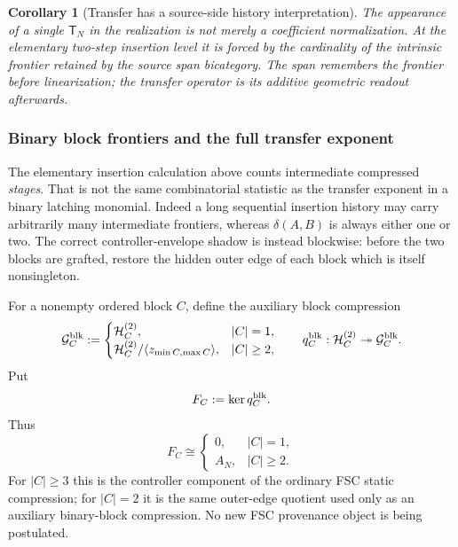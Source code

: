 \documentclass[11pt]{article}
\newtheorem{corollary}[theorem]{Corollary}
\theoremstyle{remark}
\begin{document}
\begin{corollary}[Transfer has a source-side history interpretation]
\label{P2M-cor:v15-transfer-source-history}
The appearance of a single $\mathsf T_N$ in the realization is not merely a
coefficient normalization.  At the elementary two-step insertion level it is
forced by the cardinality of the intrinsic frontier retained by the source
span bicategory.  The span remembers the frontier before linearization; the
transfer operator is its additive geometric readout afterwards.
\end{corollary}


\subsubsection{Binary block frontiers and the full transfer exponent}


The elementary insertion calculation above counts intermediate compressed
\emph{stages}.  That is not the same combinatorial statistic as the transfer
exponent in a binary latching monomial.  Indeed a long sequential insertion
history may carry arbitrarily many intermediate frontiers, whereas
$\delta(A,B)$ is always either one or two.  The correct controller-envelope shadow is
instead blockwise: before the two blocks are grafted, restore the hidden outer
edge of each block which is itself nonsingleton.

For a nonempty ordered block $C$, define the auxiliary block compression
\begin{equation}
 \mathcal G_C^{\rm blk}:=
 \begin{cases}
  \mathcal H_C^{(2)},&|C|=1,\\
  \mathcal H_C^{(2)}/\langle z_{\min C,\max C}\rangle,&|C|\ge2,
 \end{cases}
 \qquad
 q_C^{\rm blk}:\mathcal H_C^{(2)}\twoheadrightarrow
 \mathcal G_C^{\rm blk}.
\end{equation}
Put
\begin{equation}
 F_C:=\ker q_C^{\rm blk}.
\end{equation}
Thus
\begin{equation}\label{P2M-eq:v16-block-frontier-rank}
 \boxed{
 F_C\cong
 \begin{cases}
  0,&|C|=1,\\
  A_N,&|C|\ge2.
 \end{cases}}
\end{equation}
For $|C|\ge3$ this is the controller component of the ordinary FSC static
compression; for $|C|=2$ it is the same outer-edge quotient used only as an
auxiliary binary-block compression.  No new FSC provenance object is being
postulated.
\end{document}
